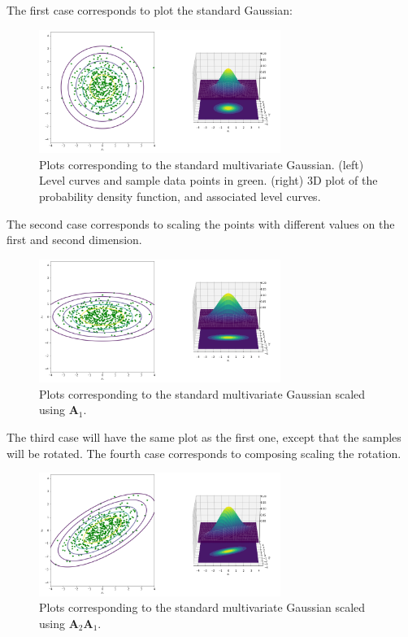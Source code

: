 The first case corresponds to plot the standard Gaussian:
\begin{figure}[H]
 \centering
 \includegraphics[width=0.7\textwidth]{fig/mv-gaussian-standard.png}
 \caption{Plots corresponding to the standard multivariate Gaussian. (left) Level curves and sample data points in green. (right) 3D plot of the probability density function, and associated level curves.}
\end{figure}

The second case corresponds to scaling the points with different values on the first and second dimension.
\begin{figure}[H]
 \centering
 \includegraphics[width=0.7\textwidth]{fig/mv-gaussian-scale.png}
 \caption{Plots corresponding to the standard multivariate Gaussian scaled using $\mathbf{A}_1$.}
\end{figure}

The third case will have the same plot as the first one, except that the samples will be rotated. The fourth case corresponds to composing scaling the rotation.
\begin{figure}[H]
 \centering
 \includegraphics[width=0.7\textwidth]{fig/mv-gaussian-full.png}
 \caption{Plots corresponding to the standard multivariate Gaussian scaled using $\mathbf{A}_2\mathbf{A}_1$.}
\end{figure}

